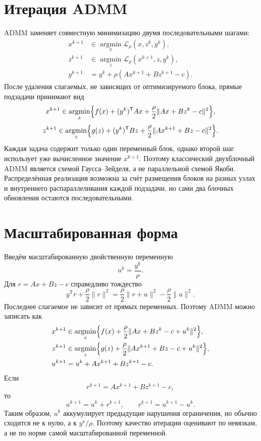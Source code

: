 \section{Итерация ADMM}

ADMM заменяет совместную минимизацию двумя последовательными шагами:
\[
\begin{aligned}
    x^{k+1}
    &\in
    \operatorname*{argmin}_{x}
    \mathcal L_\rho(x,z^k,y^k),
    \\
    z^{k+1}
    &\in
    \operatorname*{argmin}_{z}
    \mathcal L_\rho(x^{k+1},z,y^k),
    \\
    y^{k+1}
    &=
    y^k+\rho(Ax^{k+1}+Bz^{k+1}-c).
\end{aligned}
\]
После удаления слагаемых, не зависящих от оптимизируемого блока,
прямые подзадачи принимают вид
\[
\begin{aligned}
    x^{k+1}
    \in
    \operatorname*{argmin}_{x}
    \Bigl\{
        f(x)
        +(y^k)^{\mathsf T}Ax
        +\frac{\rho}{2}
        \lVert Ax+Bz^k-c\rVert^2
    \Bigr\},
\end{aligned}
\]
\[
\begin{aligned}
    z^{k+1}
    \in
    \operatorname*{argmin}_{z}
    \Bigl\{
        g(z)
        +(y^k)^{\mathsf T}Bz
        +\frac{\rho}{2}
        \lVert Ax^{k+1}+Bz-c\rVert^2
    \Bigr\}.
\end{aligned}
\]
Каждая задача содержит только один переменный блок, однако второй шаг
использует уже вычисленное значение \(x^{k+1}\). Поэтому классический
двухблочный ADMM является схемой Гаусса--Зейделя, а не параллельной
схемой Якоби. Распределённая реализация возможна за счёт размещения
блоков на разных узлах и внутреннего распараллеливания каждой
подзадачи, но сами два блочных обновления остаются последовательными.

\section{Масштабированная форма}

Введём масштабированную двойственную переменную
\[
    u^k=\frac{y^k}{\rho}.
\]
Для \(r=Ax+Bz-c\) справедливо тождество
\[
    y^{\mathsf T}r+\frac{\rho}{2}\lVert r\rVert^2
    =
    \frac{\rho}{2}\lVert r+u\rVert^2
    -
    \frac{\rho}{2}\lVert u\rVert^2.
\]
Последнее слагаемое не зависит от прямых переменных. Поэтому ADMM
можно записать как
\[
\begin{aligned}
    x^{k+1}
    &\in
    \operatorname*{argmin}_{x}
    \Bigl\{
        f(x)
        +\frac{\rho}{2}
        \lVert Ax+Bz^k-c+u^k\rVert^2
    \Bigr\},
    \\
    z^{k+1}
    &\in
    \operatorname*{argmin}_{z}
    \Bigl\{
        g(z)
        +\frac{\rho}{2}
        \lVert Ax^{k+1}+Bz-c+u^k\rVert^2
    \Bigr\},
    \\
    u^{k+1}
    &=
    u^k+Ax^{k+1}+Bz^{k+1}-c.
\end{aligned}
\]
Если
\[
    r^{k+1}=Ax^{k+1}+Bz^{k+1}-c,
\]
то
\[
    u^{k+1}=u^k+r^{k+1},
    \qquad
    r^{k+1}=u^{k+1}-u^k.
\]
Таким образом, \(u^k\) аккумулирует предыдущие нарушения ограничения,
но обычно сходится не к нулю, а к \(y^\star/\rho\). Поэтому качество
итерации оценивают по невязкам, а не по норме самой масштабированной
переменной.

